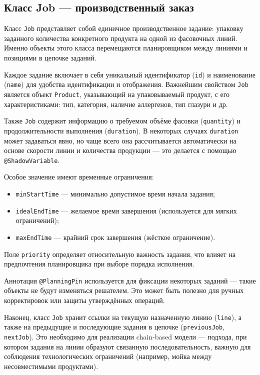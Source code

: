 \subsection*{Класс Job — производственный заказ}

Класс \texttt{Job} представляет собой единичное производственное задание: упаковку заданного количества конкретного продукта на одной из фасовочных линий. Именно объекты этого класса перемещаются планировщиком между линиями и позициями в цепочке заданий.

Каждое задание включает в себя уникальный идентификатор (\texttt{id}) и наименование (\texttt{name}) для удобства идентификации и отображения. Важнейшим свойством \texttt{Job} является объект \texttt{Product}, указывающий на упаковываемый продукт, с его характеристиками: тип, категория, наличие аллергенов, тип глазури и др.

Также \texttt{Job} содержит информацию о требуемом объёме фасовки (\texttt{quantity}) и продолжительности выполнения (\texttt{duration}). В некоторых случаях \texttt{duration} может задаваться явно, но чаще всего она рассчитывается автоматически на основе скорости линии и количества продукции — это делается с помощью \texttt{@ShadowVariable}.

Особое значение имеют временные ограничения:
\begin{itemize}
    \item \texttt{minStartTime} — минимально допустимое время начала задания;
    \item \texttt{idealEndTime} — желаемое время завершения (используется для мягких ограничений);
    \item \texttt{maxEndTime} — крайний срок завершения (жёсткое ограничение).
\end{itemize}

Поле \texttt{priority} определяет относительную важность задания, что влияет на предпочтения планировщика при выборе порядка исполнения.

Аннотация \texttt{@PlanningPin} используется для фиксации некоторых заданий — такие объекты не будут изменяться решателем. Это может быть полезно для ручных корректировок или защиты утверждённых операций.

Наконец, класс \texttt{Job} хранит ссылки на текущую назначенную линию (\texttt{line}), а также на предыдущие и последующие задания в цепочке (\texttt{previousJob}, \texttt{nextJob}). Это необходимо для реализации chain-based модели — подхода, при котором задания на линии образуют связанную последовательность, важную для соблюдения технологических ограничений (например, мойка между несовместимыми продуктами).

